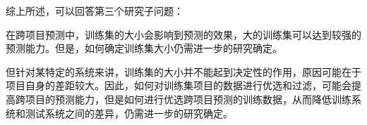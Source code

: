 综上所述，可以回答第三个研究子问题：

在跨项目预测中，训练集的大小会影响到预测的效果，大的训练集可以达到较强的预测能力。但是，如何确定训练集大小仍需进一步的研究确定。

但针对某特定的系统来讲，训练集的大小并不能起到决定性的作用，原因可能在于项目自身的差距较大。因此，如何对训练集项目的数据进行优选和过滤，可能会提高跨项目的预测能力，但是如何进行优选跨项目预测的训练数据，从而降低训练系统和测试系统之间的差异，仍需进一步的研究确定。



